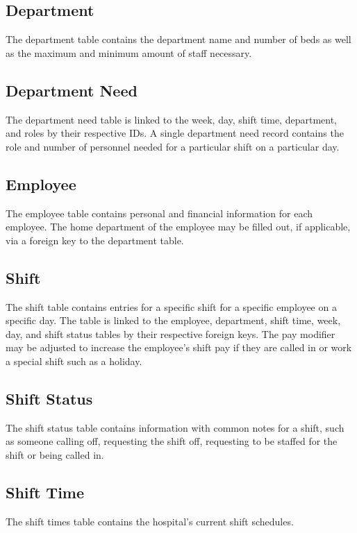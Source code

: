 \documentclass[letter,12pt]{texMemo}
\begin{document}
	\subsection*{Department}
		The department table contains the department name and number of beds as well as the maximum and minimum amount of staff necessary.
		
	\newpage
	\subsection*{Department Need}
		The department need table is linked to the week, day, shift time, department, and roles by their respective IDs. A single department need record contains the role and number of personnel needed for a particular shift on a particular day.
		
	\subsection*{Employee}
		The employee table contains personal and financial information for each employee. The home department of the employee may be filled out, if applicable, via a foreign key to the department table.
		
	\newpage	
	\subsection*{Shift}
		The shift table contains entries for a specific shift for a specific employee on a specific day. The table is linked to the employee, department, shift time, week, day, and shift status tables by their respective foreign keys. The pay modifier may be adjusted to increase the employee's shift pay if they are called in or work a special shift such as a holiday.
		
	\subsection*{Shift Status}
		The shift status table contains information with common notes for a shift, such as someone calling off, requesting the shift off, requesting to be staffed for the shift or being called in.
		
	\subsection*{Shift Time}
		The shift times table contains the hospital's current shift schedules.
		
	\newpage	
\end{document}
